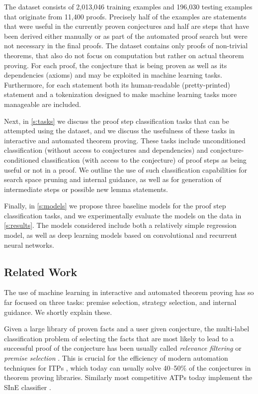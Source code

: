 \documentclass[]{article}
\begin{document}
The dataset consists of 2,013,046 training examples and 196,030 testing
examples that originate from 11,400 proofs.
Precisely half of the examples are statements that were useful in the
currently proven conjectures and half are steps that have been derived
either manually or as part of the automated proof search but were not
necessary in the final proofs. The dataset contains only
proofs of non-trivial theorems, that also do not focus on computation
but rather on actual theorem proving. For each proof, the conjecture
that is being proven as well as its dependencies (axioms) and may be
exploited in machine learning tasks. Furthermore, for each statement
both its human-readable (pretty-printed) statement and a tokenization
designed to make machine learning tasks more manageable are included.

Next, in \autoref{s:tasks} we discuss the proof step classification
tasks that can be attempted using the dataset, and we discuss the
usefulness of these tasks in interactive and automated theorem proving.
These tasks include unconditioned classification (without access to
conjectures and dependencies) and conjecture-conditioned classification
(with access to the conjecture) of proof steps as being useful or not in
a proof. We outline the use of such classification capabilities for
search space pruning and internal guidance, as well as for generation of
intermediate steps or possible new lemma statements.

Finally, in \autoref{s:models} we propose three baseline models for the
proof step classification tasks, and we experimentally evaluate the models
on the data in \autoref{s:results}. The models considered include both a
relatively simple regression model, as well as deep learning models
based on convolutional and recurrent neural networks.

\subsection{Related Work}\label{s:related}

The use of machine learning in interactive and automated theorem proving
has so far focused on three tasks: premise selection, strategy
selection, and internal guidance. We shortly explain these.

Given a large library of proven facts and a user given conjecture,
the multi-label classification problem of selecting the facts
that are most likely to lead to a successful proof of the conjecture has
been usually called \emph{relevance filtering} or \emph{premise
selection} \citep{premsel}. This is crucial for the efficiency of
modern automation techniques for ITPs \citep{hammers}, which today can
usually solve 40--50\% of the conjectures in theorem proving libraries.
Similarly most competitive ATPs today \citep{casc}
implement the SInE classifier \citep{sine}.
\end{document}
